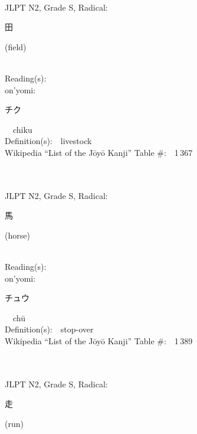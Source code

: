 \begin{multicols}{2}
{\fontsize{34pt}{40pt}  }\ \ \\  %
{JLPT N2, Grade S, Radical:\ \ {\begin{CJK}{UTF8}{min} 田 \end{CJK}} (field) } \\
Reading(s):\ \ \\
{\hspace*{1em}}on'yomi:\ \ \\
{\hspace*{2em}}{\begin{CJK}{UTF8}{min} チク \end{CJK}}\ \ chiku\ \ \\
Definition(s):\ \ livestock \\
Wikipedia ``List of the J\=oy\=o Kanji'' Table \#:\ \ 1\,367 \\
\ \ \\
{\fontsize{34pt}{40pt}  }\ \ \\  %
{JLPT N2, Grade S, Radical:\ \ {\begin{CJK}{UTF8}{min} 馬 \end{CJK}} (horse) } \\
Reading(s):\ \ \\
{\hspace*{1em}}on'yomi:\ \ \\
{\hspace*{2em}}{\begin{CJK}{UTF8}{min} チュウ \end{CJK}}\ \ ch\=u\ \ \\
Definition(s):\ \ stop-over \\
Wikipedia ``List of the J\=oy\=o Kanji'' Table \#:\ \ 1\,389 \\
\ \ \\
{\fontsize{34pt}{40pt}  }\ \ \\  %
{JLPT N2, Grade S, Radical:\ \ {\begin{CJK}{UTF8}{min} 走 \end{CJK}} (run) } \\

\end{multicols}

